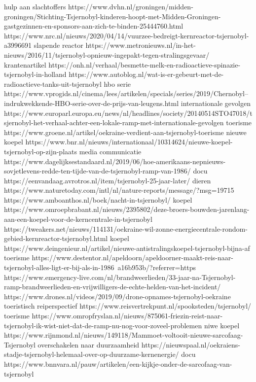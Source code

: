 hulp aan slachtoffers
https://www.dvhn.nl/groningen/midden-groningen/Stichting-Tsjernobyl-kinderen-hoopt-met-Midden-Groningen-gastgezinnen-en-sponsors-aan-zich-te-binden-25444760.html
https://www.nrc.nl/nieuws/2020/04/14/vuurzee-bedreigt-kernreactor-tsjernobyl-a3996691
slapende reactor
https://www.metronieuws.nl/in-het-nieuws/2016/11/tsjernobyl-opnieuw-ingepakt-tegen-stralingsgevaar/
krantenartikel
https://onh.nl/verhaal/besmette-melk-en-radioactieve-spinazie-tsjernobyl-in-holland
https://www.autoblog.nl/wat-is-er-gebeurt-met-de-radioactieve-tanks-uit-tsjernobyl
hbo serie
https://www.vprogids.nl/cinema/lees/artikelen/specials/series/2019/Chernobyl--indrukwekkende-HBO-serie-over-de-prijs-van-leugens.html
internationale gevolgen
https://www.europarl.europa.eu/news/nl/headlines/society/20140514STO47018/tsjernobyl-het-verhaal-achter-een-lokale-ramp-met-internationale-gevolgen
toerisme
https://www.groene.nl/artikel/oekraine-verdient-aan-tsjernobyl-toerisme
nieuwe koepel
https://www.bnr.nl/nieuws/internationaal/10314624/nieuwe-koepel-tsjernobyl-op-zijn-plaats
media communicatie
https://www.dagelijksestandaard.nl/2019/06/hoe-amerikaans-nepnieuws-sovjetlevens-redde-ten-tijde-van-de-tsjernobyl-ramp-van-1986/
docu
https://eenvandaag.avrotros.nl/item/tsjernobyl-25-jaar-later/
dieren
https://www.naturetoday.com/intl/nl/nature-reports/message/?msg=19715
https://www.amboanthos.nl/boek/nacht-in-tsjernobyl/
koepel
https://www.omroepbrabant.nl/nieuws/2395802/deze-broers-bouwden-jarenlang-aan-een-koepel-voor-de-kerncentrale-in-tsjernobyl
https://tweakers.net/nieuws/114131/oekraine-wil-zonne-energiecentrale-rondom-gebied-kernreactor-tsjernobyl.html
koepel
https://www.deingenieur.nl/artikel/nieuwe-antistralingskoepel-tsjernobyl-bijna-af
toerisme
https://www.destentor.nl/apeldoorn/apeldoorner-maakt-reis-naar-tsjernobyl-alles-ligt-er-bij-als-in-1986~a16b953b/?referrer=https%
https://www.emergency-live.com/nl/brandweerlieden/33-jaar-na-Tsjernobyl-ramp-brandweerlieden-en-vrijwilligers-de-echte-helden-van-het-incident/
https://www.drones.nl/videos/2019/09/drone-opnames-tsjernobyl-oekraine
toeristisch reiperspectief
https://www.reisvertrekpunt.nl/spooksteden/tsjernobyl/
toerisme
https://www.omropfryslan.nl/nieuws/875061-friezin-reist-naar-tsjernobyl-ik-wist-niet-dat-de-ramp-nu-nog-voor-zoveel-problemen
niwe koepel
https://www.rijnmond.nl/nieuws/149118/Mammoet-voltooit-nieuwe-sarcofaag-Tsjernobyl
overschakelen naar duurzaamheid
https://nieuwspaal.nl/oekraiens-stadje-tsjernobyl-helemaal-over-op-duurzame-kernenergie/
docu
https://www.bnnvara.nl/pauw/artikelen/een-kijkje-onder-de-sarcofaag-van-tsjernobyl
